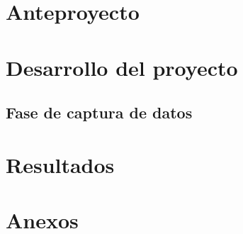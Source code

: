 \documentclass[12pt, twoside]{report}
\begin{document}




\newpage
\renewcommand{\contentsname}{\'Indice}
\tableofcontents

\newpage
\chapter{Anteproyecto}















\newpage
\chapter{Desarrollo del proyecto}

\section{Fase de captura de datos}





\newpage
\chapter{Resultados}

\newpage
\renewcommand{\bibname}{Referencias}



\newpage
\chapter{Anexos}\label{cap:anexos}

\end{document}
